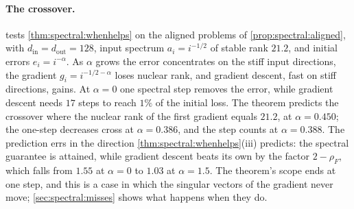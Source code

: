 \begin{refsection}
\paragraph{The crossover.}  tests \cref{thm:spectral:whenhelps} on the aligned problems of \cref{prop:spectral:aligned}, with $d_{\mathrm{in}}=d_{\mathrm{out}}=128$, input spectrum $a_i=i^{-1/2}$ of stable rank $21.2$, and initial errors $e_i=i^{-\alpha}$. As $\alpha$ grows the error concentrates on the stiff input directions, the gradient $g_i=i^{-1/2-\alpha}$ loses nuclear rank, and gradient descent, fast on stiff directions, gains. At $\alpha=0$ one spectral step removes the error, while gradient descent needs $17$ steps to reach $1\%$ of the initial loss. The theorem predicts the crossover where the nuclear rank of the first gradient equals $21.2$, at $\alpha=0.450$; the one-step decreases cross at $\alpha=0.386$, and the step counts at $\alpha=0.388$. The prediction errs in the direction \cref{thm:spectral:whenhelps}(iii) predicts: the spectral guarantee is attained, while gradient descent beats its own by the factor $2-\rho_F$, which falls from $1.55$ at $\alpha=0$ to $1.03$ at $\alpha=1.5$. The theorem's scope ends at one step, and this is a case in which the singular vectors of the gradient never move; \cref{sec:spectral:misses} shows what happens when they do.


\end{refsection}
